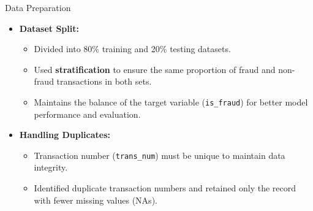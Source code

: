 \documentclass{beamer}
\begin{document}
\begin{frame}{Data Preparation}
    \begin{itemize}
        \item \textbf{Dataset Split:}
        \begin{itemize}
            \item Divided into 80\% training and 20\% testing datasets.
            \item Used \textbf{stratification} to ensure the same proportion of fraud and non-fraud transactions in both sets.
            \item Maintains the balance of the target variable (\texttt{is\_fraud}) for better model performance and evaluation.
        \end{itemize}
        \item \textbf{Handling Duplicates:}
        \begin{itemize}
            \item Transaction number (\texttt{trans\_num}) must be unique to maintain data integrity.
            \item Identified duplicate transaction numbers and retained only the record with fewer missing values (NAs).
        \end{itemize}
    \end{itemize}
\end{frame}
\end{document}
